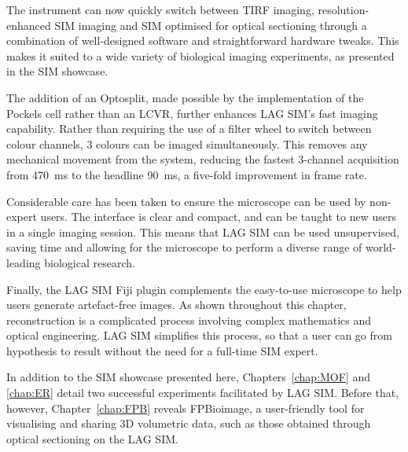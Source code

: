 The instrument can now quickly switch between TIRF imaging, resolution-enhanced SIM imaging and SIM optimised for optical sectioning through a combination of well-designed software and straightforward hardware tweaks. 
This makes it suited to a wide variety of biological imaging experiments, as presented in the SIM showcase. 

The addition of an Optosplit, made possible by the implementation of the Pockels cell rather than an LCVR, further enhances LAG SIM's fast imaging capability. 
Rather than requiring the use of a filter wheel to switch between colour channels, 3 colours can be imaged simultaneously. 
This removes any mechanical movement from the system, reducing the fastest 3-channel acquisition from \SI{470}{\milli\second} to the headline \SI{90}{\milli\second}, a five-fold improvement in frame rate. 

Considerable care has been taken to ensure the microscope can be used by non-expert users. 
The interface is clear and compact, and can be taught to new users in a single imaging session. 
This means that LAG SIM can be used unsupervised, saving time and allowing for the microscope to perform a diverse range of world-leading biological research.

Finally, the LAG SIM Fiji plugin complements the easy-to-use microscope to help users generate artefact-free images. 
As shown throughout this chapter, reconstruction is a complicated process involving complex mathematics and optical engineering. 
LAG SIM simplifies this process, so that a user can go from hypothesis to result without the need for a full-time SIM expert. 

In addition to the SIM showcase presented here, Chapters~\ref{chap:MOF} and \ref{chap:ER} detail two successful experiments facilitated by LAG SIM. 
Before that, however, Chapter~\ref{chap:FPB} reveals FPBioimage, a user-friendly tool for visualising and sharing 3D volumetric data, such as those obtained through optical sectioning on the LAG SIM. 